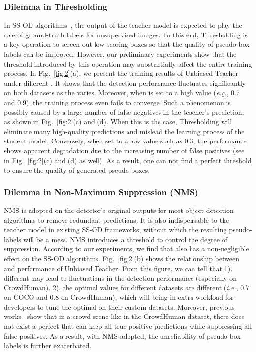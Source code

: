 \documentclass[runningheads]{llncs}
\begin{document}
\subsubsection{Dilemma in Thresholding}
In SS-OD algorithms~\cite{ubteacher,softteacher}, the output of the teacher model is expected to play the role of ground-truth labels for unsupervised images. To this end, Thresholding is a key operation to screen out low-scoring boxes so that the quality of pseudo-box labels can be improved. However, our preliminary experiments show that the threshold  introduced by this operation may substantially affect the entire training process. In Fig.~\ref{fig:2}(a), we present the training results of Unbiased Teacher under different . It shows that the detection performance fluctuates significantly on both datasets as the  varies. Moreover, when  is set to a high value (\emph{e.g.}, 0.7 and 0.9), the training process even fails to converge. Such a phenomenon is possibly caused by a large number of false negatives in the teacher's prediction, as shown in Fig.~\ref{fig:2}(c) and (d). When this is the case, Thresholding will eliminate many high-quality predictions and mislead the learning process of the student model. Conversely, when set  to a low value such as 0.3, the performance shows apparent degradation due to the increasing number of false positives (see in Fig.~\ref{fig:2}(c) and (d) as well). As a result, one can not find a perfect threshold to ensure the quality of generated pseudo-boxes.



\subsubsection{Dilemma in Non-Maximum Suppression (NMS)}
NMS is adopted on the detector's original outputs for most object detection algorithms to remove redundant predictions. It is also indispensable to the teacher model in existing SS-OD frameworks, without which the resulting pseudo-labels will be a mess. NMS introduces a threshold  to control the degree of suppression. According to our experiments, we find that  also has a non-negligible effect on the SS-OD algorithms. Fig.~\ref{fig:2}(b) shows the relationship between  and performance of Unbiased Teacher. From this figure, we can tell that 1). different  may lead to fluctuations in the detection performance (especially on CrowdHuman). 2). the optimal  values for different datasets are different (\emph{i.e.}, 0.7 on COCO and 0.8 on CrowdHuman), which will bring in extra workload for developers to tune the optimal  on their custom datasets. Moreover, previous works~\cite{ps-rcnn,r2nms} show that in a crowd scene like in the CrowdHuman dataset, there does not exist a perfect  that can keep all true positive predictions while suppressing all false positives. As a result, with NMS adopted, the unreliability of pseudo-box labels is further exacerbated.
\end{document}

